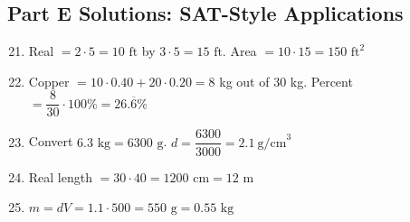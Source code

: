 \documentclass[12pt]{article}
\begin{document}
\subsection*{Part E Solutions: SAT-Style Applications}
\begin{enumerate}
  \setcounter{enumi}{20}
  \item Real \(=2\cdot5=10\text{ ft}\) by \(3\cdot5=15\text{ ft}\). Area \(=10\cdot15=\boxed{150\text{ ft}^2}\)
  \item Copper \(=10\cdot0.40+20\cdot0.20=8\) kg out of \(30\) kg. Percent \(=\dfrac{8}{30}\cdot100\%=\boxed{26.\overline{6}\%}\)
  \item Convert \(6.3\text{ kg}=6300\text{ g}\). \(d=\dfrac{6300}{3000}=\boxed{2.1\ \text{g/cm}^3}\)
  \item Real length \(=30\cdot40=1200\text{ cm}= \boxed{12\text{ m}}\)
  \item \(m=dV=1.1\cdot500=\boxed{550\text{ g}}=\boxed{0.55\text{ kg}}\)
\end{enumerate}
\end{document}
